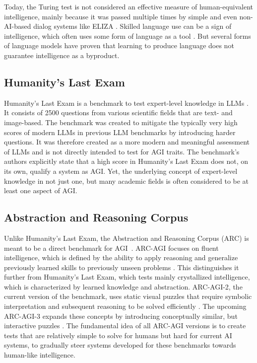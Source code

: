 Today, the Turing test is not considered an effective measure of human-equivalent intelligence, mainly because it was passed multiple times by simple and even non-AI-based dialog systems like ELIZA \citep{weizenbaum_elizagen}.
Skilled language use can be a sign of intelligence, which often uses some form of language as a tool \citep{riley_is_2025,fedorenko_language_2024}.
But several forms of language models have proven that learning to produce language does not guarantee intelligence as a byproduct.

\subsection{Humanity's Last Exam}
Humanity's Last Exam is a benchmark to test expert-level knowledge in LLMs \citep{phan_humanitys_2025}.
It consists of 2500 questions from various scientific fields that are text- and image-based.
The benchmark was created to mitigate the typically very high scores of modern LLMs in previous LLM benchmarks by introducing harder questions.
It was therefore created as a more modern and meaningful assessment of LLMs and is not directly intended to test for AGI traits.
The benchmark's authors explicitly state that a high score in Humanity's Last Exam does not, on its own, qualify a system as AGI.
Yet, the underlying concept of expert-level knowledge in not just one, but many academic fields is often considered to be at least one aspect of AGI.

\subsection{Abstraction and Reasoning Corpus}
Unlike Humanity's Last Exam, the Abstraction and Reasoning Corpus (ARC) is meant to be a direct benchmark for AGI~\citep{arc_about}.
ARC-AGI focuses on fluent intelligence, which is defined by the ability to apply reasoning and generalize previously learned skills to previously unseen problems \citep{chollet_measure_2019}.
This distinguishes it further from Humanity's Last Exam, which tests mainly crystallized intelligence, which is characterized by learned knowledge and abstraction.
ARC-AGI-2, the current version of the benchmark, uses static visual puzzles that require symbolic interpretation and subsequent reasoning to be solved efficiently \citep{chollet_arc-agi-2_2026}.
The upcoming ARC-AGI-3 expands these concepts by introducing conceptually similar, but interactive puzzles \citep{foundation_arc-agi-3_2026}.
The fundamental idea of all ARC-AGI versions is to create tests that are relatively simple to solve for humans but hard for current AI systems, to gradually steer systems developed for these benchmarks towards human-like intelligence.

